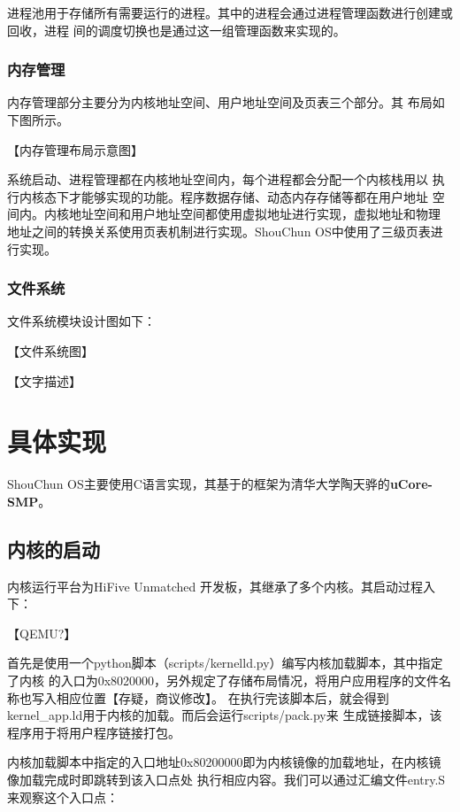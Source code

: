 \documentclass[UTF8,a4paper,10pt]{ctexart}
\begin{document}
进程池用于存储所有需要运行的进程。其中的进程会通过进程管理函数进行创建或回收，进程
间的调度切换也是通过这一组管理函数来实现的。

\subsubsection{内存管理}

内存管理部分主要分为内核地址空间、用户地址空间及页表三个部分。其
布局如下图所示。

【内存管理布局示意图】

系统启动、进程管理都在内核地址空间内，每个进程都会分配一个内核栈用以
执行内核态下才能够实现的功能。程序数据存储、动态内存存储等都在用户地址
空间内。内核地址空间和用户地址空间都使用虚拟地址进行实现，虚拟地址和物理
地址之间的转换关系使用页表机制进行实现。ShouChun OS中使用了三级页表进行实现。

\subsubsection{文件系统}

文件系统模块设计图如下：

【文件系统图】

【文字描述】

\section{具体实现}

ShouChun OS主要使用C语言实现，其基于的框架为清华大学陶天骅的\textbf{uCore-SMP}。

\subsection{内核的启动}

内核运行平台为HiFive Unmatched 开发板，其继承了多个内核。其启动过程入下：

【QEMU?】

首先是使用一个python脚本（scripts/kernelld.py）编写内核加载脚本，其中指定了内核
的入口为0x8020000，另外规定了存储布局情况，将用户应用程序的文件名称也写入相应位置【存疑，商议修改】。
在执行完该脚本后，就会得到kernel\_app.ld用于内核的加载。而后会运行scripts/pack.py来
生成链接脚本，该程序用于将用户程序链接打包。

内核加载脚本中指定的入口地址0x80200000即为内核镜像的加载地址，在内核镜像加载完成时即跳转到该入口点处
执行相应内容。我们可以通过汇编文件entry.S来观察这个入口点：
\end{document}
